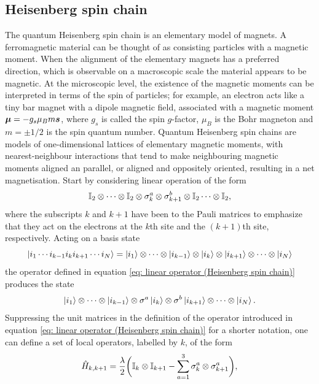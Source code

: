 \subsection{Heisenberg spin chain}
The quantum Heisenberg spin chain is an elementary model of magnets. A ferromagnetic material can be thought of as consisting particles with a magnetic moment. When the alignment of the elementary magnets has a preferred direction, which is observable on a macroscopic scale the material appears to be magnetic. At the microscopic level, the existence of the magnetic moments can be interpreted in terms of the spin of particles; for example, an electron acts like a tiny bar magnet with a dipole magnetic field, associated with a magnetic moment $\bm{\mu} = -g_s\mu_Bm\bm{s}$, where $g_s$ is called the spin $g$-factor, $\mu_B$ is the Bohr magneton and $m = \pm1/2$ is the spin quantum number. Quantum Heisenberg spin chains are models of one-dimensional lattices of elementary magnetic moments, with nearest-neighbour interactions that tend to make neighbouring magnetic moments aligned an parallel, or aligned and oppositely oriented, resulting in a net magnetisation. Start by considering linear operation of the form 
\begin{equation}
\label{eq: linear operator (Heisenberg spin chain)}
    \mathbb{I}_2 \otimes \cdots \otimes \mathbb{I}_2 \otimes \sigma^a_k \otimes \sigma^b_{k + 1} \otimes \mathbb{I}_2 \cdots \otimes \mathbb{I}_2,
\end{equation}
where the subscripts $k$ and $k + 1$ have been to the Pauli matrices to emphasize that they act on the electrons at the $k$th site and the $(k + 1)$th site, respectively. Acting on a basis state
\begin{equation}
    \ket{i_1\cdots i_{k-1}i_ki_{k+1}\cdots i_N} = \ket{i_1} \otimes \cdots \otimes \ket{i_{k-1}} \otimes \ket{i_k} \otimes \ket{i_{k+1}} \otimes \cdots \otimes \ket{i_N}
\end{equation}
the operator defined in equation \eqref{eq: linear operator (Heisenberg spin chain)} produces the state
\begin{equation}
    \ket{i_1} \otimes \cdots \otimes \ket{i_{k-1}} \otimes \sigma^a\ket{i_k} \otimes \sigma^b\ket{i_{k+1}} \otimes \cdots \otimes \ket{i_N}.
\end{equation}
Suppressing the unit matrices in the definition of the operator introduced in equation \eqref{eq: linear operator (Heisenberg spin chain)} for a shorter notation, one can define a set of local operators, labelled by $k$, of the form
\begin{equation}
\label{eq: set of local linear operators (Heisenberg spin chain)}
    \hat{H}_{k,k + 1} = \frac{\lambda}{2}\bigg(\mathbb{I}_k \otimes \mathbb{I}_{k + 1} - \sum_{a=1}^3\sigma^a_k \otimes \sigma^a_{k + 1}\bigg),
\end{equation}
